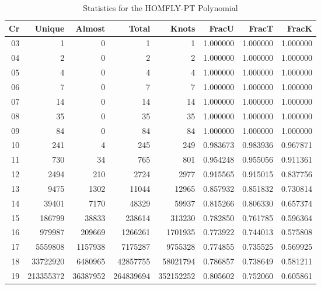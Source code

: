     \begin{table}
        \centering
        \begin{tabular}{| r | r | r | r | r | r | r | r |}
            \hline
            Cr & Unique  & Almost  &  Total  &  Knots  &  FracU   &  FracT   &  FracK\\
            \hline
            03 &         1 &        0 &         1 &         1 & 1.000000 & 1.000000 & 1.000000\\
            04 &         2 &        0 &         2 &         2 & 1.000000 & 1.000000 & 1.000000\\
            05 &         4 &        0 &         4 &         4 & 1.000000 & 1.000000 & 1.000000\\
            06 &         7 &        0 &         7 &         7 & 1.000000 & 1.000000 & 1.000000\\
            07 &        14 &        0 &        14 &        14 & 1.000000 & 1.000000 & 1.000000\\
            08 &        35 &        0 &        35 &        35 & 1.000000 & 1.000000 & 1.000000\\
            09 &        84 &        0 &        84 &        84 & 1.000000 & 1.000000 & 1.000000\\
            10 &       241 &        4 &       245 &       249 & 0.983673 & 0.983936 & 0.967871\\
            11 &       730 &       34 &       765 &       801 & 0.954248 & 0.955056 & 0.911361\\
            12 &      2494 &      210 &      2724 &      2977 & 0.915565 & 0.915015 & 0.837756\\
            13 &      9475 &     1302 &     11044 &     12965 & 0.857932 & 0.851832 & 0.730814\\
            14 &     39401 &     7170 &     48329 &     59937 & 0.815266 & 0.806330 & 0.657374\\
            15 &    186799 &    38833 &    238614 &    313230 & 0.782850 & 0.761785 & 0.596364\\
            16 &    979987 &   209669 &   1266261 &   1701935 & 0.773922 & 0.744013 & 0.575808\\
            17 &   5559808 &  1157938 &   7175287 &   9755328 & 0.774855 & 0.735525 & 0.569925\\
            18 &  33722920 &  6480965 &  42857755 &  58021794 & 0.786857 & 0.738649 & 0.581211\\
            19 & 213355372 & 36387952 & 264839694 & 352152252 & 0.805602 & 0.752060 & 0.605861\\
            \hline
        \end{tabular}
        \caption{Statistics for the HOMFLY-PT Polynomial}
        \label{tab:homflypt_stat}
    \end{table}
